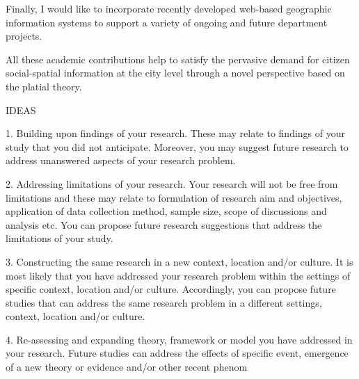 Finally, I would like to incorporate recently developed web-based geographic information systems to support a variety of ongoing and future department projects.






All these academic contributions help to satisfy the pervasive demand for citizen social-spatial information at the city level through a novel perspective based on the platial theory.




IDEAS



1. Building upon findings of your research. These may relate to findings of your study that you did not anticipate. Moreover, you may suggest future research to address unanswered aspects of your research problem.

 

2. Addressing limitations of your research. Your research will not be free from limitations and these may relate to formulation of research aim and objectives, application of data collection method, sample size, scope of discussions and analysis etc. You can propose future research suggestions that address the limitations of your study.

 

3. Constructing the same research in a new context, location and/or culture. It is most likely that you have addressed your research problem within the settings of specific context, location and/or culture. Accordingly, you can propose future studies that can address the same research problem in a different settings, context, location and/or culture.

 

4. Re-assessing and expanding theory, framework or model you have addressed in your research. Future studies can address the effects of specific event, emergence of a new theory or evidence and/or other recent phenom
